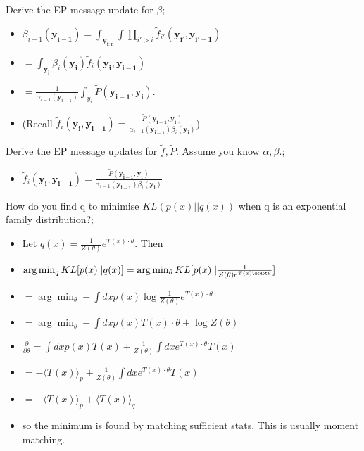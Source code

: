 \documentclass{article}
\begin{document}
Derive the EP message update for $\beta$; \begin{itemize}
    \item $\beta_{i-1}(\mathbf{y_{i-1}}) = \int_{\mathbf{y_{i:n}}} \int \prod_{i'>i} \tilde{f}_{i'}(\mathbf{y_{i'}, \mathbf{y}_{i'-1}}) 
    $
    \item $= \int_{\mathbf{y_{i}}}\beta_{i}(\mathbf{y_{i}})\tilde{f}_i(\mathbf{y_i, y_{i-1}})$
    \item $= \frac{1}{\alpha_{i-1}(\mathbf{y}_{i-1})}\int_{y_{i}}\tilde{P}(\mathbf{y_{i-1},y_i})$.
    \item (Recall $\tilde{f}_i(\mathbf{y_i, y_{i-1}}) = \frac{\tilde{P}(\mathbf{y_{i-1}, y_i})}{\alpha_{i-1}(\mathbf{y_{i-1}})\beta_i(\mathbf{y_i})}$)
\end{itemize} 

Derive the EP message updates for $\tilde{f}, \tilde{P}$. Assume you know $\alpha, \beta$.; \begin{itemize}
    \item $\tilde{f}_i(\mathbf{y_i, y_{i-1}}) = \frac{\tilde{P}(\mathbf{y_{i-1}, y_i})}{\alpha_{i-1}(\mathbf{y_{i-1}})\beta_i(\mathbf{y_i})}$
\end{itemize}

How do you find q to minimise $KL(p(x)||q(x))$ when q is an exponential family  distribution?; \begin{itemize}
    \item Let $q(x) = \frac{1}{Z(\theta)}e^{T(x)\cdot\theta}$. Then
    \item $\arg\min_q KL[p(x)||q(x)] = \arg\min_{\theta} KL[p(x)||\frac{1}{Z(\theta)e^{T(x)\dcdot\theta}}]$
    \item $= \arg\min_{\theta} - \int dx p(x) \log \frac{1}{Z(\theta)}e^{T(x)\cdot\theta}$
    \item $= \arg\min_{\theta} - \int dx p(x)T(x)\cdot \theta + \log Z(\theta)$
    \item $\frac{\partial}{\partial \theta} = \int dx p(x) T(x) + \frac{1}{Z(\theta)}\int dx e^{T(x)\cdot \theta} T(x)$
    \item $= -\langle T(x) \rangle_p + \frac{1}{Z(\theta)}\int dx e^{T(x)\cdot \theta} T(x)$
    \item $ = - \langle T(x)\rangle_p + \langle T(x) \rangle_q$.
    \item so the minimum is found by matching sufficient stats. This is usually moment matching.
\end{itemize}
\end{document}
